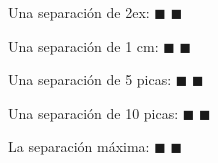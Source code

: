 \documentclass{article}
\begin{document}
Una separación de 2ex: $\blacksquare$ \hspace{2ex} $\blacksquare$

Una separación de 1 cm: $\blacksquare$ \hspace{1cm} $\blacksquare$

Una separación de 5 picas: $\blacksquare$ \hspace{5pc} $\blacksquare$

Una separación de 10 picas: $\blacksquare$ \hspace{10pc} $\blacksquare$

La separación máxima: $\blacksquare$ \hfill $\blacksquare$
\end{document}
